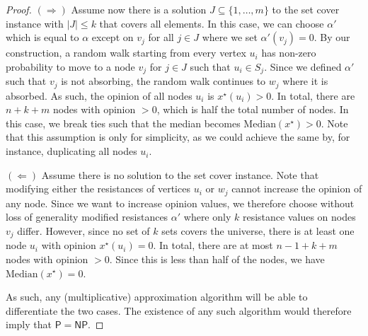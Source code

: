 \begin{proof}
$(\Rightarrow)$ Assume now there
is a solution $J \subseteq \{1, \dots, m\}$
to the set cover instance
with $|J| \le k$ that covers all elements.
In this case, we can choose
$\alpha'$ which is equal to $\alpha$
except on $v_j$ for all $j \in J$
where we set $\alpha'(v_j) = 0$.
By our construction, a random walk
starting from every vertex $u_i$ has
non-zero probability to move to
a node $v_j$ for $j \in J$ such
that $u_i \in S_j$. Since we defined
$\alpha'$ such that $v_j$ is not
absorbing, the random walk continues
to $w_j$ where it is absorbed.
As such, the opinion of all nodes
$u_i$ is $x^\star(u_i) > 0$.
In total, there are $n+k+m$ nodes
with opinion $>0$, which is
half the total number of nodes.
In this case, we
break ties such that the median
becomes $\mathrm{Median}(x^\star) >0$.
Note that this assumption is
only for simplicity, as we could
achieve the same by, for instance,
duplicating all nodes $u_i$.

$(\Leftarrow)$ Assume there is no
solution to the set cover instance.
Note that modifying either the
resistances of vertices $u_i$ or $w_j$
cannot increase the opinion of any node.
Since we want to increase opinion values,
we therefore choose without loss
of generality modified resistances $\alpha'$
where only $k$ resistance values on nodes
$v_j$ differ. However, since no set
of $k$ sets covers the universe, there is
at least one node $u_i$ with opinion
$x^\star(u_i) = 0$.
In total, there are at most $n-1+k+m$
nodes with opinion $>0$.
Since this is less than half of the
nodes, we have $\mathrm{Median}(x^\star) = 0$.

As such, any (multiplicative) approximation
algorithm will be able to differentiate
the two cases. The existence of any
such algorithm would therefore imply that
$\mathsf{P} = \mathsf{NP}$.
\end{proof}

